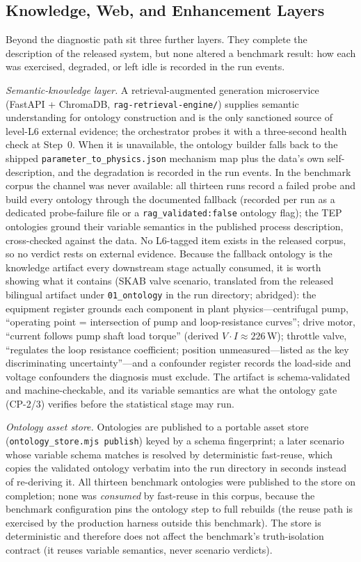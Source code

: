 \documentclass[preprint,12pt]{elsarticle}
\begin{document}
\subsection{Knowledge, Web, and Enhancement Layers}\label{sec:arch-layers}
Beyond the diagnostic path sit three further layers. They complete the description of the released system, but none altered a benchmark result: how each was exercised, degraded, or left idle is recorded in the run events.

\emph{Semantic-knowledge layer.} A retrieval-augmented generation microservice~\cite{lewis2020rag} (FastAPI + ChromaDB, \texttt{rag-retrieval-engine/}) supplies semantic understanding for ontology construction and is the only sanctioned source of level-L6 external evidence; the orchestrator probes it with a three-second health check at Step~0. When it is unavailable, the ontology builder falls back to the shipped \texttt{parameter\_to\_physics.json} mechanism map plus the data's own self-description, and the degradation is recorded in the run events. In the benchmark corpus the channel was never available: all thirteen runs record a failed probe and build every ontology through the documented fallback (recorded per run as a dedicated probe-failure file or a \texttt{rag\_validated:false} ontology flag); the TEP ontologies ground their variable semantics in the published process description, cross-checked against the data. No L6-tagged item exists in the released corpus, so no verdict rests on external evidence. Because the fallback ontology is the knowledge artifact every downstream stage actually consumed, it is worth showing what it contains (SKAB valve scenario, translated from the released bilingual artifact under \texttt{01\_ontology} in the run directory; abridged): the equipment register grounds each component in plant physics---centrifugal pump, ``operating point = intersection of pump and loop-resistance curves''; drive motor, ``current follows pump shaft load torque'' (derived $V\!\cdot\!I\approx226$\,W); throttle valve, ``regulates the loop resistance coefficient; position unmeasured---listed as the key discriminating uncertainty''---and a confounder register records the load-side and voltage confounders the diagnosis must exclude. The artifact is schema-validated and machine-checkable, and its variable semantics are what the ontology gate (CP-2/3) verifies before the statistical stage may run.

\emph{Ontology asset store.} Ontologies are published to a portable asset store (\texttt{ontology\_store.mjs publish}) keyed by a schema fingerprint; a later scenario whose variable schema matches is resolved by deterministic fast-reuse, which copies the validated ontology verbatim into the run directory in seconds instead of re-deriving it. All thirteen benchmark ontologies were published to the store on completion; none was \emph{consumed} by fast-reuse in this corpus, because the benchmark configuration pins the ontology step to full rebuilds (the reuse path is exercised by the production harness outside this benchmark). The store is deterministic and therefore does not affect the benchmark's truth-isolation contract (it reuses variable semantics, never scenario verdicts).
\end{document}
